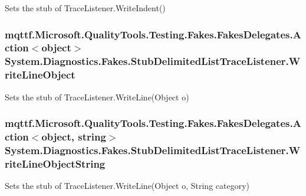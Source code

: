 Sets the stub of Trace\-Listener.\-Write\-Indent()

\hypertarget{class_system_1_1_diagnostics_1_1_fakes_1_1_stub_delimited_list_trace_listener_af7df30a577d7e644edf971372a432234}{
\subsubsection[{Write\-Line\-Object}]{\setlength{\rightskip}{0pt plus 5cm}mqttf.\-Microsoft.\-Quality\-Tools.\-Testing.\-Fakes.\-Fakes\-Delegates.\-Action$<$object$>$ System.\-Diagnostics.\-Fakes.\-Stub\-Delimited\-List\-Trace\-Listener.\-Write\-Line\-Object}}\label{class_system_1_1_diagnostics_1_1_fakes_1_1_stub_delimited_list_trace_listener_af7df30a577d7e644edf971372a432234}


Sets the stub of Trace\-Listener.\-Write\-Line(\-Object o)

\hypertarget{class_system_1_1_diagnostics_1_1_fakes_1_1_stub_delimited_list_trace_listener_a3a85897cf9ba57cbf19f179474b01c3c}{
\subsubsection[{Write\-Line\-Object\-String}]{\setlength{\rightskip}{0pt plus 5cm}mqttf.\-Microsoft.\-Quality\-Tools.\-Testing.\-Fakes.\-Fakes\-Delegates.\-Action$<$object, string$>$ System.\-Diagnostics.\-Fakes.\-Stub\-Delimited\-List\-Trace\-Listener.\-Write\-Line\-Object\-String}}\label{class_system_1_1_diagnostics_1_1_fakes_1_1_stub_delimited_list_trace_listener_a3a85897cf9ba57cbf19f179474b01c3c}


Sets the stub of Trace\-Listener.\-Write\-Line(\-Object o, String category)

